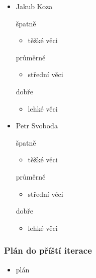 \documentclass{beamer}
\begin{document}
\begin{frame}[allowframebreaks]
\begin{itemize}
    \item Jakub Koza
      \begin{block}{špatně} %
       \begin{itemize}
        \item těžké věci
       \end{itemize}
     \end{block}
     \begin{block}{průměrně} %
        \begin{itemize}
        \item střední věci
       \end{itemize}
     \end{block}
     \begin{block}{dobře} %
       \begin{itemize}
        \item lehké věci
       \end{itemize}
     \end{block}
   
    \item Petr Svoboda
      \begin{block}{špatně} %
       \begin{itemize}
        \item těžké věci
       \end{itemize}
     \end{block}
     \begin{block}{průměrně} %
        \begin{itemize}
        \item střední věci
       \end{itemize}
     \end{block}
     \begin{block}{dobře} %
       \begin{itemize}
        \item lehké věci
       \end{itemize}
     \end{block}
   \end{itemize}
\end{frame}

\begin{frame}[allowframebreaks]\frametitle{Plán do příští iterace}
  \begin{itemize}
    \item plán
  \end{itemize}
\end{frame}
\end{document}
